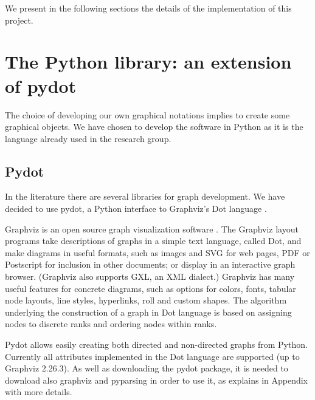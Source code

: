 \documentclass[a4paper,11pt,twoside]{report}
\begin{document}
We present in the following sections the details of the implementation of this project.

\section{The Python library: an extension of pydot}
The choice of developing our own graphical notations implies to create some graphical objects. We have chosen to develop the software in Python as it is the language already used in the research group. 



\subsection{Pydot}
In the literature there are several libraries for graph development. We have decided to use pydot, a Python interface to Graphviz's Dot language \cite{pydot}. 

Graphviz is an open source graph visualization software \cite{graphviz}. The Graphviz layout programs take descriptions of graphs in a simple text language, called Dot, and make diagrams in useful formats, such as images and SVG for web pages, PDF or Postscript for inclusion in other documents; or display in an interactive graph browser. (Graphviz also supports GXL, an XML dialect.)  Graphviz has many useful features for concrete diagrams, such as options for colors, fonts, tabular node layouts, line styles, hyperlinks, roll and custom shapes. The algorithm underlying the construction of a graph in Dot language is based on assigning nodes to discrete ranks and ordering nodes within ranks. 

Pydot allows easily creating both directed and non-directed graphs from Python. Currently all attributes implemented in the Dot language are supported (up to Graphviz 2.26.3). As well as downloading the pydot package, it is needed to download also graphviz and pyparsing in order to use it, as explains in Appendix with more details.
\end{document}

